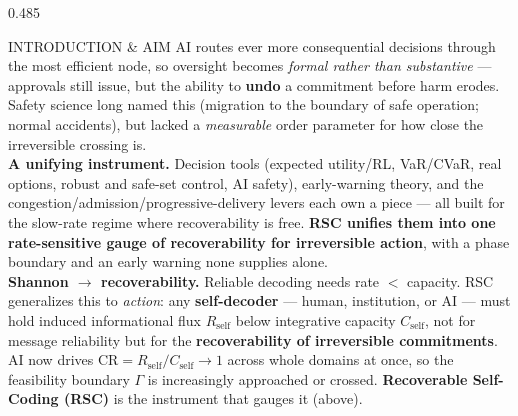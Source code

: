 \documentclass[final]{beamer}
\newcommand{\Rself}{R_{\mathrm{self}}}
\newcommand{\Cself}{C_{\mathrm{self}}}
\newlength{\colh}\setlength{\colh}{74cm}   %
\begin{document}
\begin{frame}[t]{}
\begin{columns}[t,totalwidth=\textwidth]
\begin{column}{0.485\textwidth}
\begin{minipage}[t][\colh][t]{\linewidth}
\begin{rblock}{INTRODUCTION \& AIM}
AI routes ever more consequential decisions through the most efficient node, so oversight becomes \emph{formal rather than substantive} --- approvals still issue, but the ability to \textbf{undo} a commitment before harm erodes. Safety science long named this (migration to the boundary of safe operation; normal accidents), but lacked a \emph{measurable} order parameter for how close the irreversible crossing is.\\[3mm]
{\color{rscblue}\bfseries A unifying instrument.} Decision tools (expected utility/RL, VaR/CVaR, real options, robust and safe-set control, AI safety), early-warning theory, and the congestion/admission/progressive-delivery levers each own a piece --- all built for the slow-rate regime where recoverability is free. \textbf{RSC unifies them into one rate-sensitive gauge of recoverability for irreversible action}, with a phase boundary and an early warning none supplies alone.\\[3mm]
{\color{rscblue}\bfseries Shannon $\rightarrow$ recoverability.} Reliable decoding needs rate $<$ capacity. RSC generalizes this to \emph{action}: any \textbf{self-decoder} --- human, institution, or AI --- must hold induced informational flux $\Rself$ below integrative capacity $\Cself$, not for message reliability but for the \textbf{recoverability of irreversible commitments}.\\[3mm]
AI now drives $\mathrm{CR}=\Rself/\Cself \to 1$ across whole domains at once, so the feasibility boundary $\Gamma$ is increasingly approached or crossed. \textbf{Recoverable Self-Coding (RSC)} is the instrument that gauges it (above).
\end{rblock}

\vfill


\end{minipage}
\end{column}
\end{columns}
\end{frame}
\end{document}

